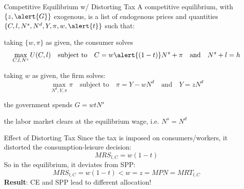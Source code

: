 \documentclass[11pt,aspectratio=169,usenames,dvipsnames]{beamer}
\let\tempa\enumerate
\let\tempb\endenumerate
\renewenvironment{enumerate}{\tempa\addtolength{\itemsep}{\fill}}{\tempb}
\begin{document}
\begin{frame}{Competitive Equilibrium w/ Distorting Tax}
\label{slide:Competitive_Equilibrium_w__Distortionary_Tax}
    A competitive equilibrium, with $ \{ z, \alert{G} \} $ exogenous, is a list of endogenous prices and quantities $ \{ C, l, N^{s}, N^{d}, Y, \pi, w, \alert{t} \} $ such that:
    \begin{enumerate}
        \item  taking $ \{ w, \pi \} $ as given, the consumer solves
        \begin{equation*}
            \max_{C, l, N^{s}} U( C, l )
            \quad \text{subject to} \quad
            C = w\alert{( 1-t )}N^{s} + \pi
            \quad \text{and} \quad
            N^{s} + l = h
        \end{equation*}
        \item taking $ w $ as given, the firm solves:
        \begin{equation*}
            \max_{N^{d}, Y, \pi} \pi
            \quad \text{subject to} \quad
            \pi = Y - w N^{d}
            \quad \text{and} \quad
            Y = z N^{d}
        \end{equation*}
        \item the government spends $ G = w t N^{s} $
        \item the labor market clears at the equilibrium wage, i.e. $ N^{s} = N^{d} $
    \end{enumerate}
\end{frame}

\begin{frame}{Effect of Distorting Tax}
\label{slide:Effect_of_Distorting_Tax}
    Since the tax is imposed on consumers/workers, it distorted the consumption-leisure decision:
    \begin{equation*}
        MRS_{l, C} = w( 1-t )
    \end{equation*}
    So in the equilibrium, it deviates from SPP:
    \begin{equation*}
        MRS_{l, C} = w( 1-t ) < w = z = MPN = MRT_{l, C}
    \end{equation*}
    \textbf{Result}: CE and SPP lead to different allocation!
\end{frame}
\end{document}
